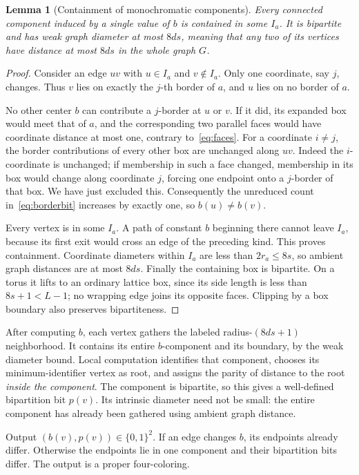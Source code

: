 \documentclass[11pt]{article}
\newtheorem{lemma}[theorem]{Lemma}
\theoremstyle{definition}\newtheorem{definition}[theorem]{Definition}
\theoremstyle{remark}\newtheorem{remark}[theorem]{Remark}
\begin{document}
\begin{lemma}[Containment of monochromatic components]\label{lem:border}
Every connected component induced by a single value of $b$ is
contained in some $I_a$. It is bipartite and has weak graph
diameter at most $8ds$, meaning that any two of its vertices have
distance at most $8ds$ in the whole graph $G$.
\end{lemma}

\begin{proof}
Consider an edge $uv$ with $u\in I_a$ and $v\notin I_a$.
Only one coordinate, say $j$, changes. Thus $v$ lies on exactly
the $j$-th border of $a$, and $u$ lies on no border of $a$.

No other center $b$ can contribute a $j$-border at $u$ or $v$.
If it did, its expanded box would meet that of $a$, and the
corresponding two parallel faces would have coordinate distance
at most one, contrary to~\eqref{eq:faces}. For a coordinate
$i\ne j$, the border contributions of every other box are
unchanged along $uv$. Indeed the $i$-coordinate is unchanged;
if membership in such a face changed, membership in its box
would change along coordinate $j$, forcing one endpoint onto
a $j$-border of that box. We have just excluded this.
Consequently the unreduced count in~\eqref{eq:borderbit} increases
by exactly one, so $b(u)\ne b(v)$.

Every vertex is in some $I_a$. A path of constant $b$ beginning
there cannot leave $I_a$, because its first exit would cross an
edge of the preceding kind. This proves containment. Coordinate
diameters within $I_a$ are less than $2r_a\le8s$, so ambient
graph distances are at most $8ds$. Finally the containing box
is bipartite. On a torus it lifts to an ordinary lattice box,
since its side length is less than $8s+1<L-1$; no wrapping edge
joins its opposite faces. Clipping by a box boundary also
preserves bipartiteness.
\end{proof}

After computing $b$, each vertex gathers the labeled
radius-$(8ds+1)$ neighborhood. It contains its entire
$b$-component and its boundary, by the weak diameter bound.
Local computation identifies that component, chooses its
minimum-identifier vertex as root, and assigns the parity of
distance to the root \emph{inside the component}. The component
is bipartite, so this gives a well-defined bipartition bit $p(v)$.
Its intrinsic diameter need not be small: the entire component
has already been gathered using ambient graph distance.

Output $(b(v),p(v))\in\{0,1\}^2$. If an edge changes $b$, its
endpoints already differ. Otherwise the endpoints lie in one
component and their bipartition bits differ. The output is a
proper four-coloring.
\end{document}
